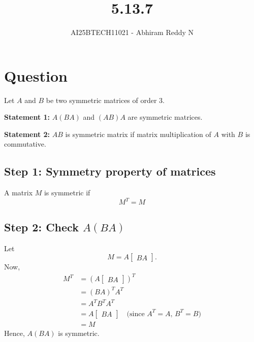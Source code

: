 \documentclass[journal]{IEEEtran}
\begin{document}

\vspace{3cm}

\title{5.13.7}
\author{AI25BTECH11021 - Abhiram Reddy N}
{\let\newpage\relax\maketitle}

\renewcommand{\thefigure}{\theenumi}
\renewcommand{\thetable}{\theenumi}
\setlength{\intextsep}{10pt} %


\renewcommand{\thetable}{\theenumi}

\section*{Question}
Let $A$ and $B$ be two symmetric matrices of order $3$.  

\textbf{Statement 1:} $A(BA)$ and $(AB)A$ are symmetric matrices.  

\textbf{Statement 2:} $AB$ is symmetric matrix if matrix multiplication of $A$ with $B$ is commutative.  

\subsection*{Step 1: Symmetry property of matrices}
A matrix $M$ is symmetric if
\begin{equation}
M^T = M
\end{equation}

\subsection*{Step 2: Check $A(BA)$}
Let 
\[
M = A \begin{bmatrix} B A \end{bmatrix}.
\]  
Now,
\begin{align}
M^T &= \left( A \begin{bmatrix} B A \end{bmatrix} \right)^T \\
&= (BA)^T A^T \\
&= A^T B^T A^T \\
&= A \begin{bmatrix} B A \end{bmatrix} \quad \text{(since $A^T=A$, $B^T=B$)} \\
&= M
\end{align}
Hence, $A(BA)$ is symmetric.
\end{document}
